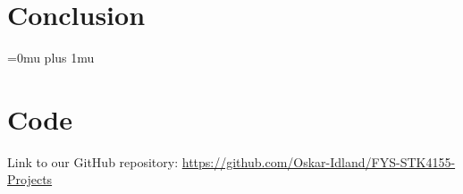 \documentclass[aps,pra,english,notitlepage,reprint,nofootinbib]{revtex4-1}  %
\begin{document}
\section{Conclusion}\label{sec:conclusion}


\Urlmuskip=0mu plus 1mu\relax
\onecolumngrid


\newpage
\appendix
\section{Code}\label{appsec:code}
Link to our GitHub repository: \href{https://github.com/Oskar-Idland/FYS-STK4155-Projects}{https://github.com/Oskar-Idland/FYS-STK4155-Projects}

\end{document}
